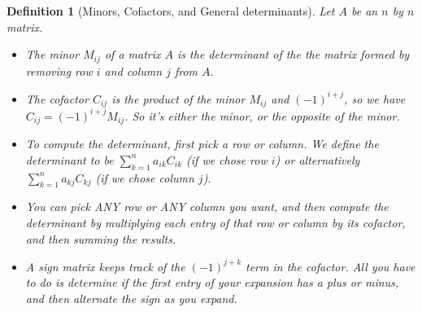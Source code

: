 \documentclass[letterpaper,oneside]{book}%
\let\oldmarginpar\marginpar
\renewcommand\marginpar[1]{\-\oldmarginpar{\raggedright\footnotesize #1}}
\theoremstyle{plain}
\theoremstyle{box}
\newtheorem{definition}[theorem]{Definition}
\theoremstyle{problem}
\begin{document}
\begin{definition}[Minors, Cofactors, and General determinants]\label{general determinants}
Let {$A$} be an $n$ by $n$ matrix. 
\begin{itemize}
 \item The minor {$M_{ij}$} of a matrix {$A$} is the determinant of the the matrix formed by removing row {$i$} and column {$j$} from {$A$}. 
 \item The cofactor $C_{ij}$ is the product of the minor $M_{ij}$ and $(-1)^{i+j}$, so we have $C_{ij} = (-1)^{i+j}M_{ij}$. So it's either the minor, or the opposite of the minor. 
 \item To compute the determinant, first pick a row or column.
We define the determinant to be $\sum_{k=1}^n a_{ik}C_{ik}$ (if we chose row $i$) or alternatively $\sum_{k=1}^n a_{kj}C_{kj}$ (if we chose column $j$).  
\item You can pick ANY row or ANY column you want, and then compute the determinant by multiplying each entry of that row or column by its cofactor, and then summing the results. 
\item 
\marginpar{
\small
\begin{tabular}{c}
$\begin{bmatrix}
+&-&+&\cdots\\
-&+&-&\cdots\\
+&-&+&\cdots\\
\vdots&\vdots&\vdots&\ddots
\end{bmatrix}$ 
\\
sign matrix
\end{tabular}%
}%
A sign matrix keeps track of the $(-1)^{j+k}$ term in the cofactor. All you have to do is determine if the first entry of your expansion has a plus or minus, and then alternate the sign as you expand.

\end{itemize}

\end{definition}
\end{document}
